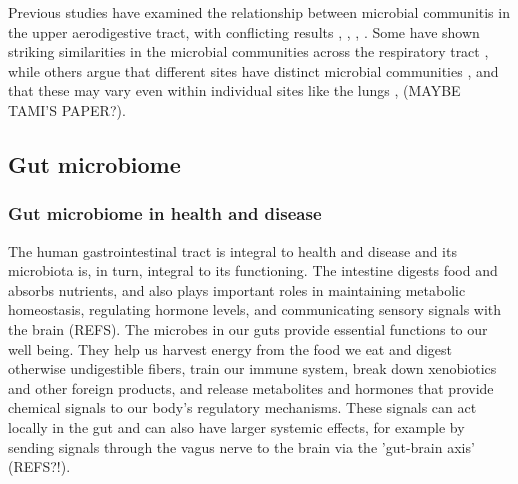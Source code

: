 \documentclass[12pt]{article}
\begin{document}
Previous studies have examined the relationship between microbial communitis in  the upper 
aerodigestive tract, with conflicting results \cite{bassis-source-2015}, \cite{rosen-ppi-2015}, \cite{charslon-topographical-2011}, \cite{almomani-cf_sputum-2016}. 
Some have shown striking similarities in the microbial
communities across the respiratory tract \cite{almomani-cf_sputum-2016}, \cite{bassis-source-2015} while others
argue that different sites have distinct microbial communities \cite{rosen-ppi-2015},
and that these may vary even within individual sites like the lungs \cite{erbdownward-copd-2011}, (MAYBE TAMI'S PAPER?).

\subsection{Gut microbiome}

\subsubsection{Gut microbiome in health and disease}

The human gastrointestinal tract is integral to health and disease
and its microbiota is, in turn, integral to its functioning.
The intestine digests food and absorbs nutrients, and  
also plays important roles in maintaining metabolic homeostasis, 
regulating hormone levels, and communicating sensory signals with the brain (REFS).
The microbes in our guts provide essential functions to our well being. 
They help us harvest energy from the food we eat and digest otherwise 
undigestible fibers, train our immune system, break down xenobiotics and 
other foreign products, and release metabolites and hormones that provide 
chemical signals to our body's regulatory mechanisms. These signals can act locally in the gut 
and can also have larger systemic effects, for example by sending signals 
through the vagus nerve to the brain via the 'gut-brain axis' (REFS?!). 
\end{document}
